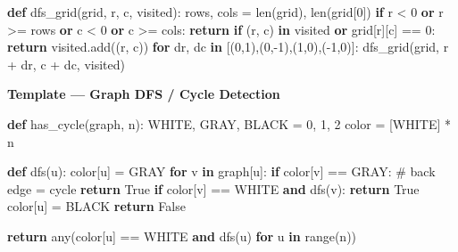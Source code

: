 \documentclass[11pt]{article}
\newenvironment{Shaded}{\begin{snugshade}}{\end{snugshade}}
\newcommand{\BuiltInTok}[1]{\textcolor[rgb]{0.50,0.55,0.55}{#1}}
\newcommand{\CommentTok}[1]{\textcolor[rgb]{0.48,0.49,0.49}{#1}}
\newcommand{\ControlFlowTok}[1]{\textcolor[rgb]{0.99,0.74,0.29}{\textbf{#1}}}
\newcommand{\DecValTok}[1]{\textcolor[rgb]{0.96,0.45,0.00}{#1}}
\newcommand{\KeywordTok}[1]{\textcolor[rgb]{0.81,0.81,0.76}{\textbf{#1}}}
\newcommand{\NormalTok}[1]{\textcolor[rgb]{0.81,0.81,0.76}{#1}}
\newcommand{\OperatorTok}[1]{\textcolor[rgb]{0.81,0.81,0.76}{#1}}
\newcommand{\VariableTok}[1]{\textcolor[rgb]{0.15,0.68,0.68}{#1}}
\begin{document}
\begin{Shaded}
\begin{Highlighting}[]
\KeywordTok{def}\NormalTok{ dfs\_grid(grid, r, c, visited):}
\NormalTok{    rows, cols }\OperatorTok{=} \BuiltInTok{len}\NormalTok{(grid), }\BuiltInTok{len}\NormalTok{(grid[}\DecValTok{0}\NormalTok{])}
    \ControlFlowTok{if}\NormalTok{ r }\OperatorTok{\textless{}} \DecValTok{0} \KeywordTok{or}\NormalTok{ r }\OperatorTok{\textgreater{}=}\NormalTok{ rows }\KeywordTok{or}\NormalTok{ c }\OperatorTok{\textless{}} \DecValTok{0} \KeywordTok{or}\NormalTok{ c }\OperatorTok{\textgreater{}=}\NormalTok{ cols:}
        \ControlFlowTok{return}
    \ControlFlowTok{if}\NormalTok{ (r, c) }\KeywordTok{in}\NormalTok{ visited }\KeywordTok{or}\NormalTok{ grid[r][c] }\OperatorTok{==} \DecValTok{0}\NormalTok{:}
        \ControlFlowTok{return}
\NormalTok{    visited.add((r, c))}
    \ControlFlowTok{for}\NormalTok{ dr, dc }\KeywordTok{in}\NormalTok{ [(}\DecValTok{0}\NormalTok{,}\DecValTok{1}\NormalTok{),(}\DecValTok{0}\NormalTok{,}\OperatorTok{{-}}\DecValTok{1}\NormalTok{),(}\DecValTok{1}\NormalTok{,}\DecValTok{0}\NormalTok{),(}\OperatorTok{{-}}\DecValTok{1}\NormalTok{,}\DecValTok{0}\NormalTok{)]:}
\NormalTok{        dfs\_grid(grid, r }\OperatorTok{+}\NormalTok{ dr, c }\OperatorTok{+}\NormalTok{ dc, visited)}
\end{Highlighting}
\end{Shaded}

\textbf{Template --- Graph DFS / Cycle Detection}


\begin{Shaded}
\begin{Highlighting}[]
\KeywordTok{def}\NormalTok{ has\_cycle(graph, n):}
\NormalTok{    WHITE, GRAY, BLACK }\OperatorTok{=} \DecValTok{0}\NormalTok{, }\DecValTok{1}\NormalTok{, }\DecValTok{2}
\NormalTok{    color }\OperatorTok{=}\NormalTok{ [WHITE] }\OperatorTok{*}\NormalTok{ n}

    \KeywordTok{def}\NormalTok{ dfs(u):}
\NormalTok{        color[u] }\OperatorTok{=}\NormalTok{ GRAY}
        \ControlFlowTok{for}\NormalTok{ v }\KeywordTok{in}\NormalTok{ graph[u]:}
            \ControlFlowTok{if}\NormalTok{ color[v] }\OperatorTok{==}\NormalTok{ GRAY:    }\CommentTok{\# back edge = cycle}
                \ControlFlowTok{return} \VariableTok{True}
            \ControlFlowTok{if}\NormalTok{ color[v] }\OperatorTok{==}\NormalTok{ WHITE }\KeywordTok{and}\NormalTok{ dfs(v):}
                \ControlFlowTok{return} \VariableTok{True}
\NormalTok{        color[u] }\OperatorTok{=}\NormalTok{ BLACK}
        \ControlFlowTok{return} \VariableTok{False}

    \ControlFlowTok{return} \BuiltInTok{any}\NormalTok{(color[u] }\OperatorTok{==}\NormalTok{ WHITE }\KeywordTok{and}\NormalTok{ dfs(u) }\ControlFlowTok{for}\NormalTok{ u }\KeywordTok{in} \BuiltInTok{range}\NormalTok{(n))}
\end{Highlighting}
\end{Shaded}
\end{document}
